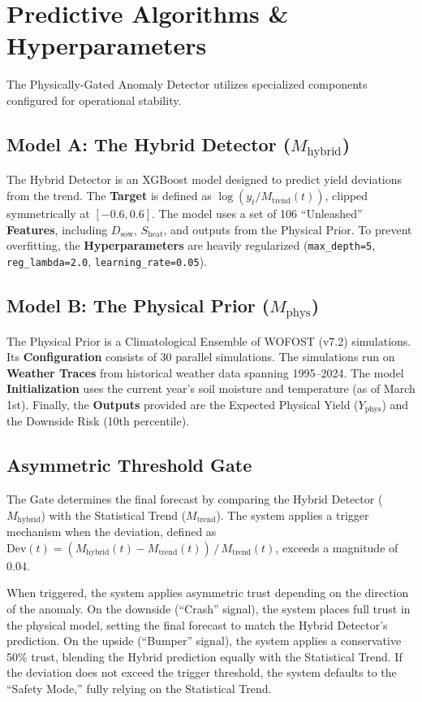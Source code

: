 \documentclass[11pt]{article}
\begin{document}
\section{Predictive Algorithms \& Hyperparameters}
The Physically-Gated Anomaly Detector utilizes specialized components configured for operational stability.

\subsection{Model A: The Hybrid Detector ($M_{\text{hybrid}}$)}
The Hybrid Detector is an XGBoost model designed to predict yield deviations from the trend. The \textbf{Target} is defined as $\log(y_t / M_{\text{trend}}(t))$, clipped symmetrically at $[-0.6, 0.6]$. The model uses a set of 106 ``Unleashed'' \textbf{Features}, including $D_{\text{sow}}$, $S_{\text{heat}}$, and outputs from the Physical Prior. To prevent overfitting, the \textbf{Hyperparameters} are heavily regularized (\texttt{max\_depth=5}, \texttt{reg\_lambda=2.0}, \texttt{learning\_rate=0.05}).

\subsection{Model B: The Physical Prior ($M_{\text{phys}}$)}
The Physical Prior is a Climatological Ensemble of WOFOST (v7.2) simulations. Its \textbf{Configuration} consists of 30 parallel simulations. The simulations run on \textbf{Weather Traces} from historical weather data spanning 1995--2024. The model \textbf{Initialization} uses the current year's soil moisture and temperature (as of March 1st). Finally, the \textbf{Outputs} provided are the Expected Physical Yield ($Y_{\text{phys}}$) and the Downside Risk (10th percentile).

\subsection{Asymmetric Threshold Gate}
The Gate determines the final forecast by comparing the Hybrid Detector ($M_{\text{hybrid}}$) with the Statistical Trend ($M_{\text{trend}}$). The system applies a trigger mechanism when the deviation, defined as $\text{Dev}(t) = (M_{\text{hybrid}}(t) - M_{\text{trend}}(t))\, /\, M_{\text{trend}}(t)$, exceeds a magnitude of $0.04$.

When triggered, the system applies asymmetric trust depending on the direction of the anomaly. On the downside (``Crash'' signal), the system places full trust in the physical model, setting the final forecast to match the Hybrid Detector's prediction. On the upside (``Bumper'' signal), the system applies a conservative 50\% trust, blending the Hybrid prediction equally with the Statistical Trend. If the deviation does not exceed the trigger threshold, the system defaults to the ``Safety Mode,'' fully relying on the Statistical Trend.
\end{document}
